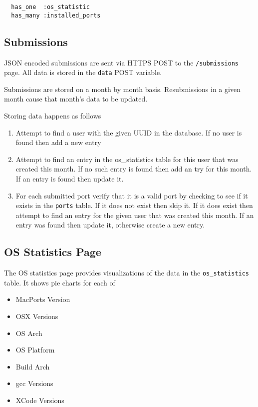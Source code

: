 \documentclass[10pt]{article}
\begin{document}
\begin{verbatim}
  has_one  :os_statistic
  has_many :installed_ports
\end{verbatim}

\subsection{Submissions}

JSON encoded submissions are sent via HTTPS POST to the \texttt{/submissions} page. All data is stored in the \texttt{data} POST variable.

Submissions are stored on a month by month basis. Resubmissions in a given month cause that month's data to be updated.

Storing data happens as follows
\begin{enumerate}
  \item Attempt to find a user with the given UUID in the database. If no user is found then add a new entry
  \item Attempt to find an entry in the os\_statistics table for this user that was created this month. If no such entry is found then add an try for this month. If an entry is found then update it.
  \item For each submitted port verify that it is a valid port by checking to see if it exists in the \texttt{ports} table. If it does not exist then skip it. If it does exist then attempt to find an entry for the given user that was created this month. If an entry was found then update it, otherwise create a new entry.
\end{enumerate}
 
\subsection{OS Statistics Page}

The OS statistics page provides visualizations of the data in the \texttt{os\_statistics} table. It shows pie charts for each of
\begin{itemize}
  \item MacPorts Version
  \item OSX Versions
  \item OS Arch
  \item OS Platform
  \item Build Arch
  \item gcc Versions
  \item XCode Versions
\end{itemize}
\end{document}
